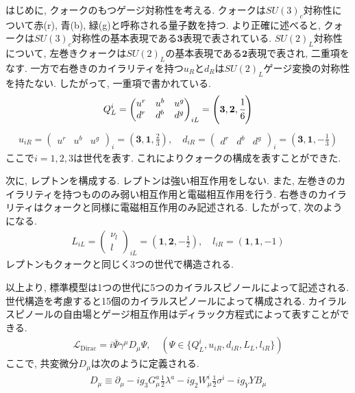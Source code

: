 はじめに, クォークのもつゲージ対称性を考える.
クォークは$SU(3)_c$対称性について赤(r), 青(b), 緑(g)と呼称される量子数を持つ.
より正確に述べると, クォークは$SU(3)_c$対称性の基本表現である$\bm{3}$表現で表されている.
$SU(2)_L$対称性について, 左巻きクォークは$SU(2)_L$の基本表現である$\bm{2}$表現で表され, 二重項をなす.
一方で右巻きのカイラリティを持つ$u_R$と$d_R$は$SU(2)_L$ゲージ変換の対称性を持たない.
したがって, 一重項で書かれている.
\begin{align}
Q^i_L = \begin{pmatrix}
      u^r & u^b & u^g \\
      d^r & d^b & d^g
    \end{pmatrix}_{iL} = \left(\bm{3}, \bm{2}, \cfrac{1}{6}\right)
\end{align}
\begin{align}
  u_{iR} = \begin{pmatrix} 
    u^r & u^b & u^g
  \end{pmatrix}_i = \left(\bm{3} ,\bm{1}, \frac{2}{3}\right),\quad
  d_{iR} = \begin{pmatrix} 
    d^r & d^b & d^g
  \end{pmatrix}_i = \left(\bm{3} ,\bm{1}, -\frac{1}{3}\right)
\end{align}
ここで$i=1,2,3$は世代を表す.
これによりクォークの構成を表すことができた.

次に, レプトンを構成する.
レプトンは強い相互作用をしない.
また, 左巻きのカイラリティを持つもののみ弱い相互作用と電磁相互作用を行う.
右巻きのカイラリティはクォークと同様に電磁相互作用のみ記述される.
したがって, 次のようになる.
\begin{align}
  L_{iL} = \begin{pmatrix}
    \nu_l \\
    l
  \end{pmatrix}_{iL} = \left(\bm{1}, \bm{2}, -\frac{1}{2}\right),\quad
  l_{iR} = \left(\bm{1}, \bm{1}, -1\right)
\end{align}
レプトンもクォークと同じく3つの世代で構造される.

以上より, 標準模型は1つの世代に5つのカイラルスピノールによって記述される.
世代構造を考慮すると15個のカイラルスピノールによって構成される.
カイラルスピノールの自由場とゲージ相互作用はディラック方程式によって表すことができる.
\begin{align}
  \mathcal{L}_{\mathrm{Dirac}} = i\overline{\Psi}\gamma^\mu D_\mu \Psi,\quad \left(\Psi\in\{Q^i_L, u_{iR}, d_{iR}, L_L, l_{iR} \}\right)
\end{align}
ここで, 共変微分$D_\mu$は次のように定義される.
\begin{align}
  D_\mu \equiv \partial_\mu -ig_3 G_\mu^a \frac{1}{2}\lambda^a -ig_2 W_\mu^i\frac{1}{2}\sigma^i -ig_Y Y B_\mu
\end{align}


